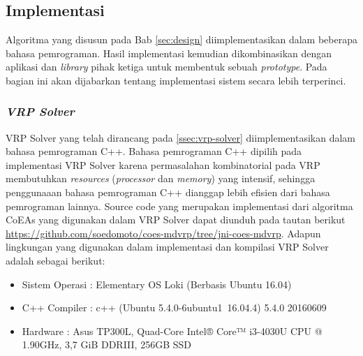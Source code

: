 \chapter{\babLima}


\newcommand\MyHead[2]{%
	\multicolumn{1}{l}{\parbox{#1}{\centering #2}}
}


\section{Implementasi}
\label{sec:implementation}
Algoritma yang disusun pada Bab \ref{sec:design} diimplementasikan dalam beberapa bahasa pemrograman. Hasil implementasi kemudian dikombinasikan dengan aplikasi dan \textit{library} pihak ketiga untuk membentuk sebuah \textit{prototype}. Pada bagian ini akan dijabarkan tentang implementasi sistem secara lebih terperinci.


\subsection{\textit{VRP Solver}}
VRP Solver yang telah dirancang pada \autoref{ssec:vrp-solver} diimplementasikan dalam bahasa pemrograman C++. Bahasa pemrograman C++ dipilih pada implementasi VRP Solver karena permasalahan kombinatorial pada VRP membutuhkan \textit{resources} (\textit{processor} dan \textit{memory}) yang intensif, sehingga penggunaaan bahasa pemrograman C++ dianggap lebih efisien dari bahasa pemrograman lainnya. Source code yang merupakan implementasi dari algoritma CoEAs yang digunakan dalam VRP Solver dapat diunduh pada tautan berikut  \url{https://github.com/soedomoto/coes-mdvrp/tree/jni-coes-mdvrp}. Adapun lingkungan yang digunakan dalam implementasi dan kompilasi VRP Solver adalah sebagai berikut:


\begin{itemize}
\item Sistem Operasi		: Elementary OS Loki (Berbasis Ubuntu 16.04)
\item C++ Compiler			: c++ (Ubuntu 5.4.0-6ubuntu1~16.04.4) 5.4.0 20160609
\item Hardware				: Asus TP300L, Quad-Core Intel® Core™ i3-4030U CPU @ 1.90GHz, 3,7 GiB DDRIII, 256GB SSD
\end{itemize}


